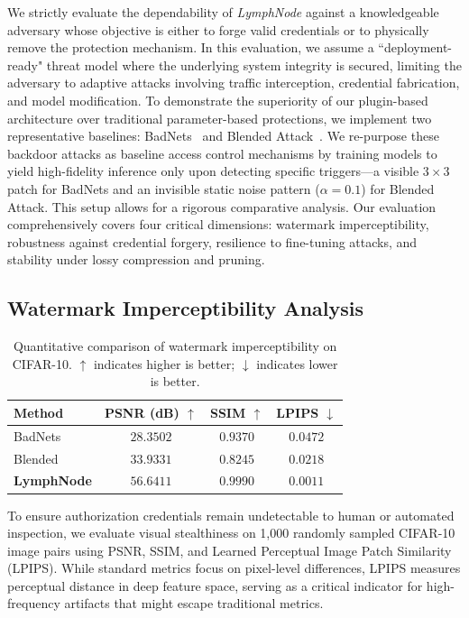 \documentclass[conference]{IEEEtran}
\begin{document}
We strictly evaluate the dependability of \textit{LymphNode} against a knowledgeable adversary whose objective is either to forge valid credentials or to physically remove the protection mechanism. In this evaluation, we assume a ``deployment-ready" threat model where the underlying system integrity is secured, limiting the adversary to adaptive attacks involving traffic interception, credential fabrication, and model modification. To demonstrate the superiority of our plugin-based architecture over traditional parameter-based protections, we implement two representative baselines: BadNets~\cite{gu2017badnets} and Blended Attack~\cite{chen2017targeted}. We re-purpose these backdoor attacks as baseline access control mechanisms by training models to yield high-fidelity inference only upon detecting specific triggers—a visible $3\times3$ patch for BadNets and an invisible static noise pattern ($\alpha=0.1$) for Blended Attack. This setup allows for a rigorous comparative analysis. Our evaluation comprehensively covers four critical dimensions: watermark imperceptibility, robustness against credential forgery, resilience to fine-tuning attacks, and stability under lossy compression and pruning.

\subsection{Watermark Imperceptibility Analysis}

\begin{table}[ht]
    \centering
    \caption{Quantitative comparison of watermark imperceptibility on CIFAR-10. $\uparrow$ indicates higher is better; $\downarrow$ indicates lower is better.}
    \label{tab:imperceptibility_stats}
    \small 
    \renewcommand{\arraystretch}{1.25} 
    \setlength{\tabcolsep}{10pt} 
    
    \begin{tabular}{lccc}
        \toprule
        \textbf{Method} & \textbf{PSNR (dB)} $\uparrow$ & \textbf{SSIM} $\uparrow$ & \textbf{LPIPS} $\downarrow$ \\
        \midrule
        BadNets  & $28.3502 $ & $0.9370 $ & $0.0472$ \\
        Blended  & $33.9331 $ & $0.8245 $ & $0.0218 $ \\
        \midrule
        \textbf{LymphNode} & $\mathbf{56.6411 }$ & $\mathbf{0.9990 }$ & $\mathbf{0.0011 }$ \\
        \bottomrule
    \end{tabular}
\end{table}
To ensure authorization credentials remain undetectable to human or automated inspection, we evaluate visual stealthiness on 1,000 randomly sampled CIFAR-10 image pairs using PSNR, SSIM, and Learned Perceptual Image Patch Similarity (LPIPS). While standard metrics focus on pixel-level differences, LPIPS measures perceptual distance in deep feature space, serving as a critical indicator for high-frequency artifacts that might escape traditional metrics.
\end{document}
